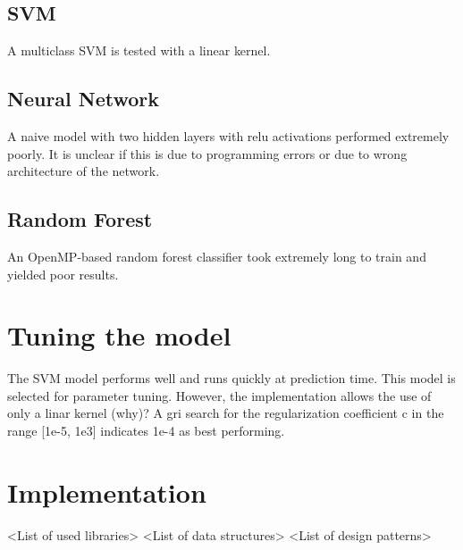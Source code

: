 \documentclass{article}
\begin{document}
\subsection{SVM}
A multiclass SVM is tested with a linear kernel.



\subsection{Neural Network}
A naive model with two hidden layers with relu activations performed extremely poorly.
It is unclear if this is due to programming errors or due to wrong architecture of the network.


\subsection{Random Forest}
An OpenMP-based random forest classifier took extremely long to train and yielded poor results.


\section{Tuning the model}
The SVM model performs well and runs quickly at prediction time.
This model is selected for parameter tuning.
However, the implementation allows the use of only a linar kernel (why)?
A gri search for the regularization coefficient c in the range [1e-5, 1e3] indicates 1e-4 as best performing.


\section{Implementation}
<List of used libraries>
<List of data structures>
<List of design patterns>
\end{document}
